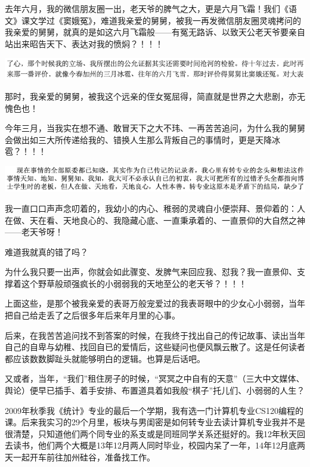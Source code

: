 \documentclass[9pt, b5paper]{article}
\begin{document}
去年六月，我的微信朋友圈一出，老天爷的脾气之大，更是六月飞霜！我们《语文》课文学过《窦娥冤》，难道我亲爱的舅舅，被我一再发微信朋友圈灵魂拷问的我亲爱的舅舅，就真的是如这六月飞霜般——有冤无路诉、以致天公老天爷要亲自站出来昭告天下、表达对我的愤焖？！！！

\begin{center}
\includegraphics[width=.9\linewidth]{./pic/backups_plans_20210423_230138.png}
\end{center}

那时，我亲爱的舅舅，被我这个远亲的侄女冤屈得，简直就是世界之大悲剧，亦无愧色也！

今年三月，当我实在想不通、敢冒天下之大不玮、一再苦苦追问，为什么我的舅舅会做出如三大所传递给我的、错换人生那么背叛自己的事情时，更是天降冰雹？！！！

\begin{center}
\includegraphics[width=.9\linewidth]{./pic/backups_plans_20210422_090142.png}
\end{center}

我一直口口声声念叨着的，我幼小的内心、稚弱的灵魂自小便崇拜、景仰着的：人在做、天在看、天地良心的、我隐藏心底、一直秉承着的、一直景仰的大自然之神——老天爷呀！

难道我就真的错了吗？

为什么我只要一出声，你就会如此骤变、发脾气来回应我、怼我？我一直景仰、支撑着这个野草般顽强疯长的小弱弱我的天地至公的老天爷？！！！

上面这些，是那个被我亲爱的表哥万般宠爱过的我表哥眼中的少女心小弱弱，当年把自己给走丢了之后很多年后来年月里的心事。 

后来，在我苦苦追问找不到答案的时候，在我终于找出自己的传记故事、读出当年自己的自卑与幼稚、找回自已的爱情后，这些疑问也便风飘云散了。这是任何读者都应该数数脚趾头就能够明白的逻辑。也算是后话吧。 

又或者，当年，“我们”租住房子的时候，“冥冥之中自有的天意”（三大中文媒体、舆论）便早已插手、着手安排、布置道具着如我般“棋子”托儿们、小弱弱的人生？

2009年秋季我《统计》专业的最后一个学期，我有选一门计算机专业CS120编程的课。后来我实习的29个月里，板块与男闺密是如何转专业去读计算机专业我并不是很清楚，只知道他们两个同专业的系支或是同班同学关系还挺好的。我12年秋天回去读书，他们两个大概是13年12月两人同时毕业，校园内呆了一年，14年12月底两天一起开车前往加州硅谷，准备找工作。 
\end{document}
